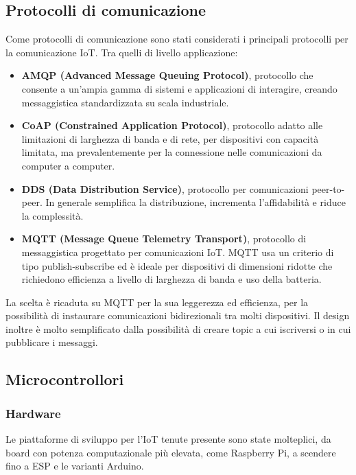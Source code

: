         \subsection{Protocolli di comunicazione}
        Come protocolli di comunicazione sono stati considerati i principali protocolli per la comunicazione IoT. Tra quelli di livello applicazione: 
        \begin{itemize}
            \item \textbf{AMQP (Advanced Message Queuing Protocol)}, protocollo che consente a un'ampia gamma di sistemi e applicazioni di interagire, creando messaggistica standardizzata su scala industriale.
            \item \textbf{CoAP (Constrained Application Protocol)}, protocollo adatto alle limitazioni di larghezza di banda e di rete, per dispositivi con capacità limitata, ma prevalentemente per la connessione nelle comunicazioni da computer a computer. 
            \item \textbf{DDS (Data Distribution Service)}, protocollo per comunicazioni peer-to-peer. In generale semplifica la distribuzione, incrementa l'affidabilità e riduce la complessità.
            \item \textbf{MQTT (Message Queue Telemetry Transport)}, protocollo di messaggistica progettato per comunicazioni IoT. MQTT usa un criterio di tipo publish-subscribe ed è ideale per dispositivi di dimensioni ridotte che richiedono efficienza a livello di larghezza di banda e uso della batteria.
        \end{itemize}
        La scelta è ricaduta su MQTT per la sua leggerezza ed efficienza, per la possibilità di instaurare comunicazioni bidirezionali tra molti dispositivi. Il design inoltre è molto semplificato dalla possibilità di creare topic a cui iscriversi o in cui pubblicare i messaggi.
        
        \subsection{Microcontrollori}
        \subsubsection{Hardware}
        Le piattaforme di sviluppo per l'IoT tenute presente sono state molteplici, da board con potenza computazionale più elevata, come Raspberry Pi, a scendere fino a ESP e le varianti Arduino. 
        
